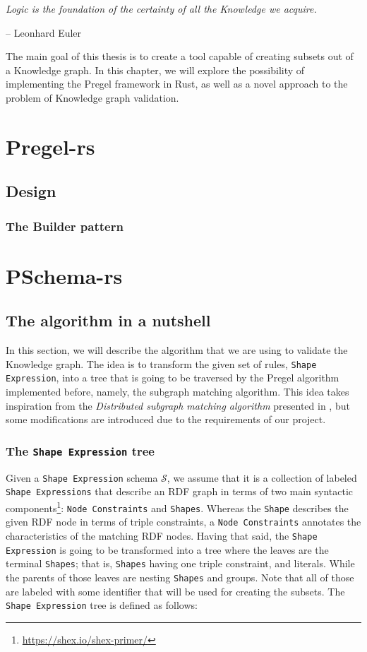 \epigraph{\textit{Logic is the foundation of the certainty of all the Knowledge we acquire.}}{-- \textup{Leonhard Euler}}

The main goal of this thesis is to create a tool capable of creating subsets out of a Knowledge graph. In this chapter, we will explore the possibility of implementing the Pregel framework in Rust, as well as a novel approach to the problem of Knowledge graph validation.

\section{Pregel-rs}

\subsection{Design}

\subsubsection{The Builder pattern}

\section{PSchema-rs}

\subsection{The algorithm in a nutshell}

In this section, we will describe the algorithm that we are using to validate the Knowledge graph. The idea is to transform the given set of rules, \texttt{Shape Expression}, into a tree that is going to be traversed by the Pregel algorithm implemented before, namely, the subgraph matching algorithm. This idea takes inspiration from the \textit{Distributed subgraph matching algorithm} presented in \cite{Xu2019}, but some modifications are introduced due to the requirements of our project.

\subsubsection{The \texttt{Shape Expression} tree}

Given a \texttt{Shape Expression} schema $\mathcal{S}$, we assume that it is a collection of labeled \texttt{Shape Expressions} that describe an RDF graph in terms of two main syntactic components\footnote{\url{https://shex.io/shex-primer/}}: \texttt{Node Constraints} and \texttt{Shapes}. Whereas the \texttt{Shape} describes the given RDF node in terms of triple constraints, a \texttt{Node Constraints} annotates the characteristics of the matching RDF nodes. Having that said, the \texttt{Shape Expression} is going to be transformed into a tree where the leaves are the terminal \texttt{Shapes}; that is, \texttt{Shapes} having one triple constraint, and literals. While the parents of those leaves are nesting \texttt{Shapes} and groups. Note that all of those are labeled with some identifier that will be used for creating the subsets. The \texttt{Shape Expression} tree is defined as follows:

